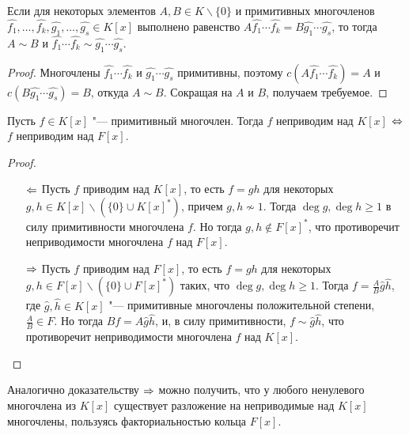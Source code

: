 \begin{corollary}
	Если для некоторых элементов $A, B \in K \backslash \{0\}$ и примитивных многочленов $\widehat{f_1}, \dotsc, \widehat{f_k}, \widehat{g_1}, \dotsc, \widehat{g_s} \in K[x]$ выполнено равенство $A\widehat{f_1}\dotsm\widehat{f_k} = B\widehat{g_1}\dotsm\widehat{g_s}$, то тогда $A \sim B$ и $\widehat{f_1}\dotsm\widehat{f_k} \sim \widehat{g_1}\dotsm\widehat{g_s}$.
\end{corollary}

\begin{proof}
	Многочлены $\widehat{f_1}\dotsm\widehat{f_k}$ и $\widehat{g_1}\dotsm\widehat{g_s}$ примитивны, поэтому $c(A\widehat{f_1}\dotsm\widehat{f_k}) = A$ и $c(B\widehat{g_1}\dotsm\widehat{g_s}) = B$, откуда $A \sim B$. Сокращая на $A$ и $B$, получаем требуемое.
\end{proof}

\begin{proposition}
	Пусть $f \in K[x]$ "--- примитивный многочлен. Тогда $f$ неприводим над $K[x]$ $\Leftrightarrow$ $f$ неприводим над $F[x]$.
\end{proposition}

\begin{proof}~
	\begin{itemize}
		\item[$\Leftarrow$] Пусть $f$ приводим над $K[x]$, то есть $f = gh$ для некоторых $g, h \in K[x] \backslash (\{0\} \cup K[x]^*)$, причем $g, h \not\sim 1$. Тогда $\deg{g}, \deg{h} \ge 1$ в силу примитивности многочлена $f$. Но тогда $g, h \not\in F[x]^*$, что противоречит неприводимости многочлена $f$ над $F[x]$.
		\item[$\Rightarrow$] Пусть $f$ приводим над $F[x]$, то есть $f = gh$ для некоторых $g, h \in F[x] \backslash (\{0\} \cup F[x]^*)$ таких, что $\deg{g}, \deg{h} \ge 1$. Тогда $f = \frac{A}{B}\widehat{g}\widehat{h}$, где $\widehat{g}, \widehat{h} \in K[x]$ "--- примитивные многочлены положительной степени, $\frac AB \in F$. Но тогда $Bf = A\widehat{g}\widehat{h}$, и, в силу примитивности, $f \sim \widehat{g}\widehat{h}$, что противоречит неприводимости многочлена $f$ над $K[x]$.\qedhere
	\end{itemize}
\end{proof}

\begin{note}
	Аналогично доказательству $\Rightarrow$ можно получить, что у любого ненулевого многочлена из $K[x]$ существует разложение на неприводимые над $K[x]$ многочлены, пользуясь факториальностью кольца $F[x]$.
\end{note}

